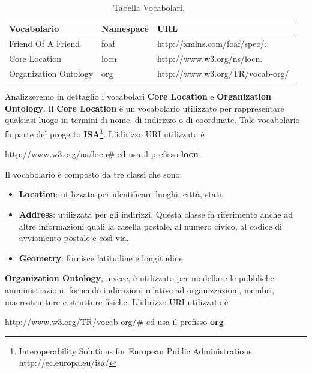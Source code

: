 \documentclass[a4paper,11pt]{article}
\begin{document}
\begin{enumerate}
\begin{enumerate}[label*=\arabic*.]
\begin{table}[!htbp]
		\begin{center}				
		\begin{tabular}{|>{\small}l|>{\small}l|>{\small}l|}
				\hline
				\textbf{Vocabolario} & \textbf{Namespace} & \textbf{URL}\\				
				\hline
				Friend Of A Friend & foaf & http://xmlns.com/foaf/spec/.\\
				\hline
				Core Location & locn & http://www.w3.org/ns/locn.\\
				\hline
				Organization Ontology & org & http://www.w3.org/TR/vocab-org/\\
				\hline			
		\end{tabular}	
		\caption{Tabella Vocabolari.}	
		\end{center}	
	\end{table}
Analizzeremo in dettaglio i vocabolari \textbf{Core Location} e \textbf{Organization Ontology}.
	\newpage
	Il \textbf{Core Location} è un vocabolario utilizzato per rappresentare qualsiasi luogo in termini di nome, di indirizzo o di coordinate. Tale vocabolario fa parte del progetto \textbf{ISA}\footnote{Interoperability Solutions for European Public Administrations. http://ec.europa.eu/isa/}. L'idirizzo URI utilizzato è
	
\medskip

http://www.w3.org/ns/locn\# ed usa il prefisso \textbf{locn}

\medskip

Il vocabolario è composto da tre classi che sono:
\begin{itemize}
	\item \textbf{Location}: utilizzata per identificare luoghi, città, stati.  
	\item \textbf{Address}: utilizzata per gli indirizzi.\newline
	Questa classe fa riferimento anche ad altre informazioni quali la casella postale, al numero civico, al codice di avviamento postale e così via.
	\item \textbf{Geometry}: fornisce latitudine e longitudine 
\end{itemize} 

	\textbf{Organization Ontology}, invece, è utilizzato per modellare le pubbliche amministrazioni, fornendo indicazioni relative ad organizzazioni, membri, macrostrutture e strutture fisiche.
L'idirizzo URI utilizzato è
	
\medskip

http://www.w3.org/TR/vocab-org/\# ed usa il prefisso \textbf{org}


\end{enumerate}
\end{enumerate}
\end{document}
